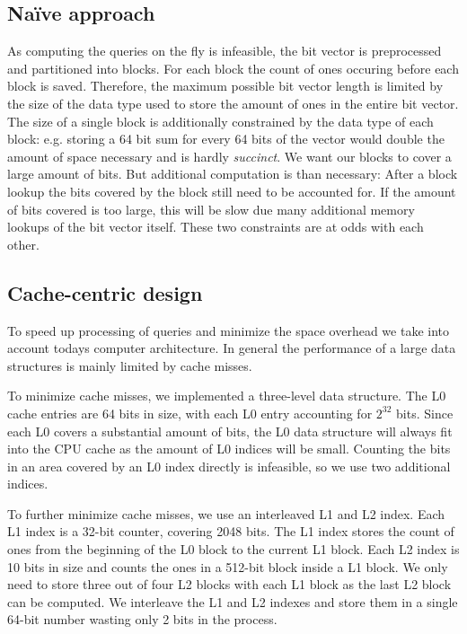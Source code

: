 \documentclass[a4paper,UKenglish,cleveref, autoref, thm-restate]{lipics-v2021}
\begin{document}
\subsection{Naïve approach}
As computing the queries on the fly is infeasible, the bit vector is preprocessed
and partitioned into blocks. For each block the count of ones occuring before each
block is saved. Therefore, the maximum possible bit vector length
is limited by the size of the data type used to store the amount of ones in the
entire bit vector.
The size of a single block is additionally constrained by the data type of each block:
e.g. storing a 64 bit sum for
every 64 bits of the vector would double the amount of space necessary and is hardly \textit{succinct}.
We want our blocks to cover a large amount of bits. But additional computation is than necessary:
After a block lookup the bits covered by the block
still need to be accounted for. If the amount of bits covered is too large, this
will be slow due many additional memory lookups of the bit vector itself.
These two constraints are at odds with each other.

\subsection{Cache-centric design}
To speed up processing of queries and minimize the space overhead we take
into account todays computer architecture. In general the performance of a large data
structures is mainly limited by cache misses.

To minimize cache misses, we implemented a three-level data structure.
The L0 cache entries are 64 bits in size, with each L0 entry accounting for $2^{32}$
bits. Since each L0 covers a substantial amount of bits, the L0 data structure
will always fit into the CPU cache as the amount of L0 indices will be small.
Counting the bits in an area covered by an L0 index directly is infeasible, so we use two additional
indices.

To further minimize cache misses, we use an interleaved L1 and L2 index.
Each L1 index is a 32-bit counter, covering 2048 bits.
The L1 index stores the count of ones from the beginning of the L0 block to
the current L1 block. Each L2 index is 10 bits in size and counts the ones in a 512-bit block inside a L1 block. We only need to store three out of four
L2 blocks with each L1 block as the last L2 block can be computed.
We interleave the L1 and L2 indexes and store them in a single 64-bit number
wasting only 2 bits in the process.
\end{document}
